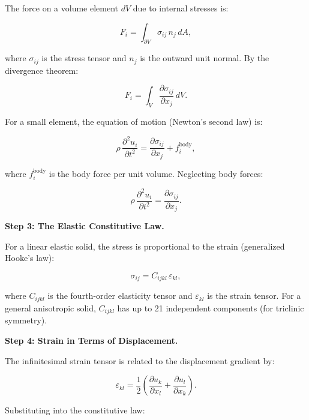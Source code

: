 The force on a volume element $dV$ due to internal stresses is:

\begin{equation}
F_i = \int_{\partial V} \sigma_{ij}\,n_j\,dA,
\end{equation}

where $\sigma_{ij}$ is the stress tensor and $n_j$ is the outward unit normal. By the divergence theorem:

\begin{equation}
F_i = \int_V \frac{\partial \sigma_{ij}}{\partial x_j}\,dV.
\end{equation}

For a small element, the equation of motion (Newton's second law) is:

\begin{equation}
\rho\,\frac{\partial^2 u_i}{\partial t^2} = \frac{\partial \sigma_{ij}}{\partial x_j} + f_i^{\text{body}},
\end{equation}

where $f_i^{\text{body}}$ is the body force per unit volume. Neglecting body forces:

\begin{equation}
\rho\,\frac{\partial^2 u_i}{\partial t^2} = \frac{\partial \sigma_{ij}}{\partial x_j}. \tag{1}
\end{equation}

\textbf{Step 3: The Elastic Constitutive Law.}

For a linear elastic solid, the stress is proportional to the strain (generalized Hooke's law):

\begin{equation}
\sigma_{ij} = C_{ijkl}\,\varepsilon_{kl},
\end{equation}

where $C_{ijkl}$ is the fourth-order elasticity tensor and $\varepsilon_{kl}$ is the strain tensor. For a general anisotropic solid, $C_{ijkl}$ has up to 21 independent components (for triclinic symmetry).

\textbf{Step 4: Strain in Terms of Displacement.}

The infinitesimal strain tensor is related to the displacement gradient by:

\begin{equation}
\varepsilon_{kl} = \frac{1}{2}\left(\frac{\partial u_k}{\partial x_l} + \frac{\partial u_l}{\partial x_k}\right).
\end{equation}

Substituting into the constitutive law:


